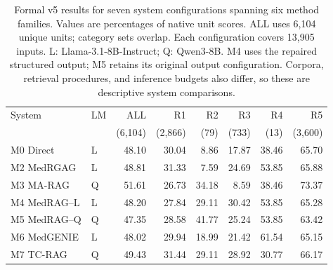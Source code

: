 \begin{table}[tb]
\centering
\small
\setlength{\tabcolsep}{3.5pt}
\caption{Formal v5 results for seven system configurations spanning six method families. Values are percentages of native unit scores. ALL uses 6,104 unique units; category sets overlap. Each configuration covers 13,905 inputs. L: Llama-3.1-8B-Instruct; Q: Qwen3-8B. M4 uses the repaired structured output; M5 retains its original output configuration. Corpora, retrieval procedures, and inference budgets also differ, so these are descriptive system comparisons.}
\label{tab:seven-baselines}
\begin{tabular*}{\linewidth}{@{\extracolsep{\fill}}llrrrrrr@{}}
\toprule
System & LM & ALL & R1 & R2 & R3 & R4 & R5 \\
 & & (6,104) & (2,866) & (79) & (733) & (13) & (3,600) \\
\midrule
M0 Direct & L & 48.10 & 30.04 & 8.86 & 17.87 & 38.46 & 65.70 \\
M2 MedRGAG & L & 48.81 & 31.33 & 7.59 & 24.69 & 53.85 & 65.88 \\
M3 MA-RAG & Q & 51.61 & 26.73 & 34.18 & 8.59 & 38.46 & 73.37 \\
M4 MedRAG--L & L & 48.20 & 27.84 & 29.11 & 30.42 & 53.85 & 65.28 \\
M5 MedRAG--Q & Q & 47.35 & 28.58 & 41.77 & 25.24 & 53.85 & 63.42 \\
M6 MedGENIE & L & 48.02 & 29.94 & 18.99 & 21.42 & 61.54 & 65.15 \\
M7 TC-RAG & Q & 49.43 & 31.44 & 29.11 & 28.92 & 30.77 & 66.17 \\
\bottomrule
\end{tabular*}
\end{table}

